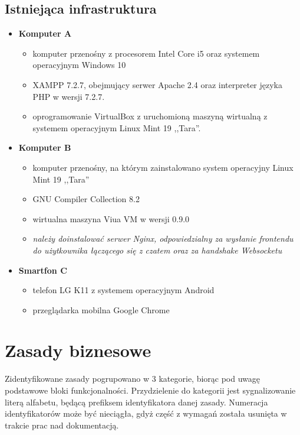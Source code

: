 \subsection{Istniejąca infrastruktura}
\label{existing-infr}
\begin{itemize}
	\item \textbf{Komputer A}
	\begin{itemize}
		\item komputer przenośny z procesorem Intel Core i5 oraz systemem operacyjnym Windows 10
		\item XAMPP 7.2.7, obejmujący serwer Apache 2.4 oraz interpreter języka PHP w wersji 7.2.7.
    \item oprogramowanie VirtualBox z uruchomioną maszyną wirtualną z systemem
    operacyjnym Linux Mint 19 ,,Tara''.
	\end{itemize}

	\item \textbf{Komputer B}
	\begin{itemize}
		\item komputer przenośny, na którym zainstalowano system operacyjny Linux Mint 19 ,,Tara''
		\item GNU Compiler Collection 8.2
		\item wirtualna maszyna Viua VM w wersji 0.9.0
		\item \textit{należy doinstalować serwer Nginx, odpowiedzialny za wysłanie frontendu do
		użytkownika łączącego się z czatem oraz za handshake Websocketu}
	\end{itemize}

  \item \textbf{Smartfon C}
  \begin{itemize}
    \item telefon LG K11 z systemem operacyjnym Android
    \item przeglądarka mobilna Google Chrome
  \end{itemize}
\end{itemize}
\section{Zasady biznesowe}

Zidentyfikowane zasady pogrupowano w 3 kategorie, biorąc pod uwagę podstawowe bloki funkcjonalności. Przydzielenie
do kategorii jest sygnalizowanie literą alfabetu, będącą prefiksem identyfikatora danej zasady. Numeracja identyfikatorów może być nieciągła, gdyż
część z wymagań została usunięta w trakcie prac nad dokumentacją.

